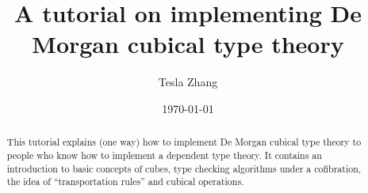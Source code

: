 \documentclass[reqno]{amsart}
\begin{document}
\title{A tutorial on implementing De Morgan cubical type theory}

\author{Tesla Zhang}
\address{The Pennsylvania State University}
\date\today

\newcommand{\GuestName}{\textsc{Guest0x0}}

\begin{abstract}
This tutorial explains (one way) how to implement De Morgan cubical type theory
to people who know how to implement a dependent type theory. It contains an introduction
to basic concepts of cubes, type checking algorithms under a cofibration,
the idea of ``transportation rules'' and cubical operations.
\end{abstract}
\maketitle
\tableofcontents


\printbibliography
\end{document}
